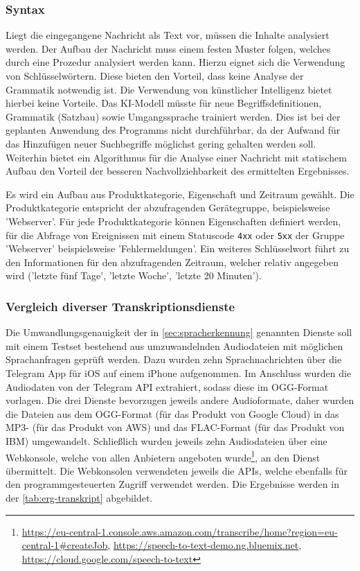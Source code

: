 \subsubsection{Syntax}
\label{sec:syntax}

Liegt die eingegangene Nachricht als Text vor, müssen die Inhalte analysiert werden. Der Aufbau der Nachricht muss einem festen Muster folgen, welches durch eine Prozedur analysiert werden kann. Hierzu eignet sich die Verwendung von Schlüsselwörtern. Diese bieten den Vorteil, dass keine Analyse der Grammatik notwendig ist. Die Verwendung von künstlicher Intelligenz bietet hierbei keine Vorteile. Das KI-Modell müsste für neue Begriffsdefinitionen, Grammatik (Satzbau) sowie Umgangssprache trainiert werden. Dies ist bei der geplanten Anwendung des Programms nicht durchführbar, da der Aufwand für das Hinzufügen neuer Suchbegriffe möglichst gering gehalten werden soll. Weiterhin bietet ein Algorithmus für die Analyse einer Nachricht mit statischem Aufbau den Vorteil der besseren Nachvollziehbarkeit des ermittelten Ergebnisses.

Es wird ein Aufbau aus Produktkategorie, Eigenschaft und Zeitraum gewählt. Die Produktkategorie entspricht der abzufragenden Gerätegruppe, beispielsweise 'Webserver'. Für jede Produktkategorie können Eigenschaften definiert werden, für die Abfrage von Ereignissen mit einem Statuscode \lstinline{4xx} oder \lstinline{5xx} der Gruppe 'Webserver' beispielsweise 'Fehlermeldungen'. Ein weiteres Schlüsselwort führt zu den Informationen für den abzufragenden Zeitraum, welcher relativ angegeben wird ('letzte fünf Tage', 'letzte Woche', 'letzte 20 Minuten').

\subsubsection{Vergleich diverser Transkriptionsdienste}
\label{sec:vergleich-transkrip}

Die Umwandlungsgenauigkeit der in \autoref{sec:spracherkennung} genannten Dienste soll mit einem Testset bestehend aus umzuwandelnden Audiodateien mit möglichen Sprachanfragen geprüft werden. Dazu wurden zehn Sprachnachrichten über die Telegram App für iOS auf einem iPhone aufgenommen. Im Anschluss wurden die Audiodaten von der Telegram API extrahiert, sodass diese im OGG-Format vorlagen. Die drei Dienste bevorzugen jeweils andere Audioformate, daher wurden die Dateien aus dem OGG-Format (für das Produkt von Google Cloud) in das MP3- (für das Produkt von AWS) und das FLAC-Format (für das Produkt von IBM) umgewandelt. Schließlich wurden jeweils zehn Audiodateien über eine Webkonsole, welche von allen Anbietern angeboten wurde\footnote{\url{https://eu-central-1.console.aws.amazon.com/transcribe/home?region=eu-central-1\#createJob}, \url{https://speech-to-text-demo.ng.bluemix.net}, \url{https://cloud.google.com/speech-to-text}}, an den Dienst übermittelt. Die Webkonsolen verwendeten jeweils die APIs, welche ebenfalls für den programmgesteuerten Zugriff verwendet werden. Die Ergebnisse werden in der \autoref{tab:erg-transkript} abgebildet.

